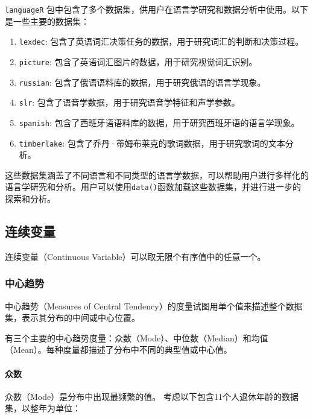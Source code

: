 \documentclass[]{book}
\let\oldparagraph\paragraph
\renewcommand{\paragraph}[1]{\oldparagraph{#1}\mbox{}}
\begin{document}
\texttt{languageR} 包中包含了多个数据集，供用户在语言学研究和数据分析中使用。以下是一些主要的数据集：

\begin{enumerate}
\def\labelenumi{\arabic{enumi}.}
\item
  \texttt{lexdec}: 包含了英语词汇决策任务的数据，用于研究词汇的判断和决策过程。
\item
  \texttt{picture}: 包含了英语词汇图片的数据，用于研究视觉词汇识别。
\item
  \texttt{russian}: 包含了俄语语料库的数据，用于研究俄语的语言学现象。
\item
  \texttt{slr}: 包含了语音学数据，用于研究语音学特征和声学参数。
\item
  \texttt{spanish}: 包含了西班牙语语料库的数据，用于研究西班牙语的语言学现象。
\item
  \texttt{timberlake}: 包含了乔丹·蒂姆布莱克的歌词数据，用于研究歌词的文本分析。
\end{enumerate}

这些数据集涵盖了不同语言和不同类型的语言学数据，可以帮助用户进行多样化的语言学研究和分析。用户可以使用\texttt{data()}函数加载这些数据集，并进行进一步的探索和分析。

\hypertarget{ux8fdeux7eedux53d8ux91cf}{%
\subsection{连续变量}\label{ux8fdeux7eedux53d8ux91cf}}

连续变量（Continuous Variable）可以取无限个有序值中的任意一个。

\hypertarget{ux4e2dux5fc3ux8d8bux52bf}{%
\subsubsection{中心趋势}\label{ux4e2dux5fc3ux8d8bux52bf}}

中心趋势（Measures of Central Tendency）的度量试图用单个值来描述整个数据集，表示其分布的中间或中心位置。

有三个主要的中心趋势度量：众数（Mode）、中位数（Median）和均值（Mean）。每种度量都描述了分布中不同的典型值或中心值。

\hypertarget{ux4f17ux6570}{%
\paragraph{众数}\label{ux4f17ux6570}}

众数（Mode）是分布中出现最频繁的值。
考虑以下包含11个人退休年龄的数据集，以整年为单位：
\end{document}
